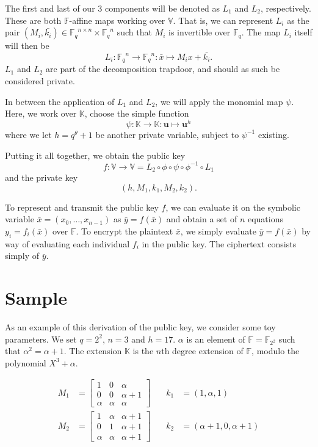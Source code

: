 \documentclass{article}
\newcommand{\F}{\ensuremath{\mathbb{F}}}
\newcommand{\Fq}{\ensuremath{\F_q}}
\newcommand{\K}{\ensuremath{\mathbb{K}}}
\newcommand{\V}{\ensuremath{\mathbb{V}}}
\newcommand{\vv}[1]{\ensuremath{\bar{#1}}}
\newcommand{\kk}[1]{\ensuremath{\mathbf{#1}}}
\begin{document}
The first and last of our 3 components will be denoted as $L_1$ and $L_2$, respectively.
These are both $\F$-affine maps working over $\V$.
That is, we can represent $L_i$ as the pair $(M_i, \vv{k_i}) \in \Fq^{n \times n} \times \Fq^n$ such that $M_i$ is invertible over $\Fq$.
The map $L_i$ itself will then be \[L_i : \Fq^n \to \Fq^n : \vv{x} \mapsto M_i x + \vv{k_i}.\]
$L_1$ and $L_2$ are part of the decomposition trapdoor, and should as such be considered private.

In between the application of $L_1$ and $L_2$, we will apply the monomial map $\psi$.
Here, we work over $\K$, choose the simple function \[\psi : \K \to \K : \kk{u} \mapsto \kk{u}^h\] where we let $h = q^\theta + 1$ be another private variable, subject to $\psi^{-1}$ existing.

Putting it all together, we obtain the public key \[f : \V \to \V = L_2 \circ \phi \circ \psi \circ \phi^{-1} \circ L_1\] and the private key \[(h, M_1, k_1, M_2, k_2).\]

To represent and transmit the public key $f$, we can evaluate it on the symbolic variable $\vv{x} = (x_0, \dots, x_{n - 1})$ as $\vv{y} = f(\vv{x})$ and obtain a set of $n$ equations $y_i = f_i(\vv{x})$ over $\F$.
To encrypt the plaintext $\vv{x}$, we simply evaluate $\vv{y} = f(\vv{x})$ by way of evaluating each individual $f_i$ in the public key.
The ciphertext consists simply of $\vv{y}$.

\section{Sample}

As an example of this derivation of the public key, we consider some toy parameters. We set $q = 2^2$, $n = 3$ and $h = 17$. $\alpha$ is an element of $\F = \F_{2^2}$ such that $\alpha^2 = \alpha + 1$. The extension $\K$ is the $n$th degree extension of $\F$, modulo the polynomial $X^3 + \alpha$.

\begin{align*}M_1 &= \begin{bmatrix}1 & 0 & \alpha \\ 0 & 0 & \alpha + 1 \\ \alpha & \alpha & \alpha \end{bmatrix} \quad &k_1 &= (1, \alpha, 1)
\\
M_2 &= \begin{bmatrix}1 & \alpha & \alpha + 1 \\ 0 & 1 & \alpha + 1 \\ \alpha & \alpha & \alpha + 1 \end{bmatrix} \quad &k_2 &= (\alpha + 1, 0, \alpha + 1)\end{align*}
\end{document}
